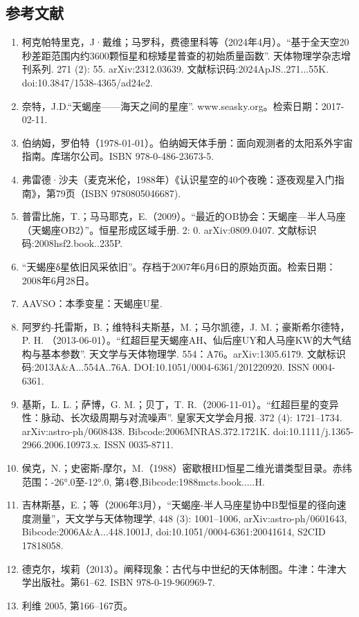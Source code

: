 \subsection{参考文献}
\begin{enumerate}
\item 柯克帕特里克，J·戴维；马罗科，费德里科等（2024年4月）。“基于全天空20秒差距范围内约3600颗恒星和棕矮星普查的初始质量函数”. 天体物理学杂志增刊系列. 271 (2): 55. arXiv:2312.03639. 文献标识码:2024ApJS..271...55K. doi:10.3847/1538-4365/ad24e2.
\item 奈特，J.D.“天蝎座——海天之间的星座”. www.seasky.org。检索日期：2017-02-11.
\item 伯纳姆，罗伯特（1978-01-01）。伯纳姆天体手册：面向观测者的太阳系外宇宙指南。库瑞尔公司。ISBN 978-0-486-23673-5.
\item 弗雷德·沙夫（麦克米伦，1988年）《认识星空的40个夜晚：逐夜观星入门指南》，第79页（ISBN 9780805046687).
\item 普雷比施，T.；马马耶克，E.（2009）。“最近的OB协会：天蝎座—半人马座（天蝎座OB2）”。恒星形成区域手册. 2: 0. arXiv:0809.0407. 文献标识码:2008hsf2.book..235P.
\item “天蝎座δ星依旧风采依旧”。存档于2007年6月6日的原始页面。检索日期：2008年6月28日。
\item AAVSO：本季变星：天蝎座U星.
\item 阿罗约-托雷斯，B.；维特科夫斯基，M.；马尔凯德，J. M.；豪斯希尔德特，P. H. （2013-06-01）。“红超巨星天蝎座AH、仙后座UY和人马座KW的大气结构与基本参数”. 天文学与天体物理学. 554：A76。arXiv:1305.6179. 文献标识码:2013A&A...554A..76A. DOI:10.1051/0004-6361/201220920. ISSN 0004-6361.
\item 基斯，L. L.；萨博，G. M.；贝丁，T. R.（2006-11-01）。“红超巨星的变异性：脉动、长次级周期与对流噪声”. 皇家天文学会月报. 372 (4): 1721–1734. arXiv:astro-ph/0608438. Bibcode:2006MNRAS.372.1721K. doi:10.1111/j.1365-2966.2006.10973.x. ISSN 0035-8711.
\item 侯克，N.；史密斯-摩尔，M.（1988）密歇根HD恒星二维光谱类型目录。赤纬范围：-26°.0至-12°.0, 第4卷,Bibcode:1988mcts.book.....H.
\item 吉林斯基，E.；等（2006年3月），“天蝎座-半人马座星协中B型恒星的径向速度测量”，天文学与天体物理学, 448 (3): 1001–1006, arXiv:astro-ph/0601643, Bibcode:2006A&A...448.1001J, doi:10.1051/0004-6361:20041614, S2CID 17818058.
\item 德克尔，埃莉（2013）。阐释现象：古代与中世纪的天体制图。牛津：牛津大学出版社。第61–62. ISBN 978-0-19-960969-7.
\item 利维 2005, 第166–167页。

\end{enumerate}
